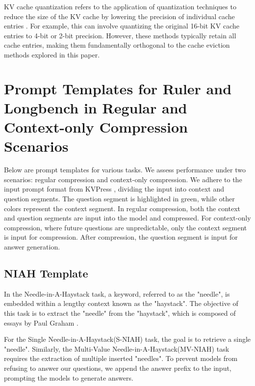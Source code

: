 {KV cache quantization refers to the application of quantization techniques to reduce the size of the KV cache by lowering the precision of individual cache entries \citep{liu2024kivi,hooper2024kvquant}. For example, this can involve quantizing the original 16-bit KV cache entries to 4-bit or 2-bit precision. However, these methods typically retain all cache entries, making them fundamentally orthogonal to the cache eviction methods explored in this paper.







{
\section{Prompt Templates for Ruler and Longbench in Regular and Context-only Compression Scenarios}
\label{apdx:prompt_templates}
}

Below are prompt templates for various tasks. We assess performance under two scenarios: regular compression and context-only compression. We adhere to the input prompt format from KVPress \cite{kvpress}, dividing the input into context and question segments. The question segment is highlighted in green, while other colors represent the context segment. In regular compression, both the context and question segments are input into the model and compressed. For context-only compression, where future questions are unpredictable, only the context segment is input for compression. After compression, the question segment is input for answer generation.
\subsection{NIAH Template}


In the Needle-in-A-Haystack task, a keyword, referred to as the "needle", is embedded within a lengthy context known as the "haystack". The objective of this task is to extract the "needle" from the "haystack", which is composed of essays by Paul Graham \cite{needle}.

For the Single Needle-in-A-Haystack(S-NIAH) task, the goal is to retrieve a single "needle". Similarly, the Multi-Value Needle-in-A-Haystack(MV-NIAH) task requires the extraction of multiple inserted "needles". To prevent models from refusing to answer our questions, we append the answer prefix to the input, prompting the models to generate answers.


\begin{table*}[h]
	\small
	\centering
		\caption{Single retrieval and multi retrieval templates in Needle-in-A-Haystack tests.}
	\label{tab:ruler_task_template1}
\end{table*}}
